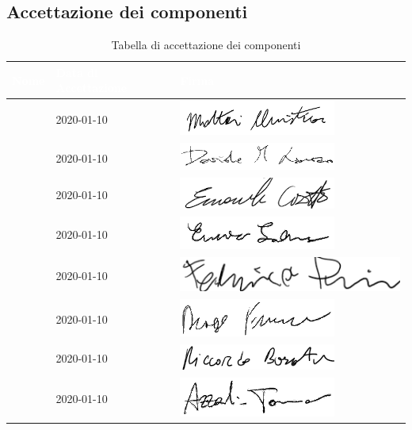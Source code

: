 \subsection{Accettazione dei componenti}
{
	\renewcommand{\arraystretch}{2}
	\begin{longtable}{ C{5cm} C{4cm} C{5cm} }
		\caption{Tabella di accettazione dei componenti}\\
		\textcolor{white}{\textbf{Nome}} & \textcolor{white}{\textbf{Data di Accettazione}} & \textcolor{white}{\textbf{Firma}}\\	\endhead
		
		
		\MC{} & 2020-01-10 & \includegraphics[scale=0.70]{Sezioni/Firme/Christian.png}\\
		\LD{} & 2020-01-10 & \includegraphics[scale=0.60]{Sezioni/Firme/Davide.png}\\
		\CE{} & 2020-01-10 & \includegraphics[scale=0.70]{Sezioni/Firme/Emanuele.png} \\
		\SE{} & 2020-01-10 & \includegraphics[scale=0.70]{Sezioni/Firme/Enrico.png}\\
		\PF{} & 2020-01-10 & \includegraphics[scale=0.50]{Sezioni/Firme/Federico.png}\\
		\DF{} & 2020-01-10 & \includegraphics[scale=0.70]{Sezioni/Firme/Francesco.png} \\
		\BR{} & 2020-01-10& \includegraphics[scale=0.70]{Sezioni/Firme/Riccardo.png} \\
		\AT{} & 2020-01-10 & \includegraphics[scale=0.70]{Sezioni/Firme/Tommaso.png} \\
		
		
	\end{longtable}
}

